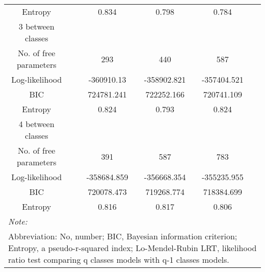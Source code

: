 \documentclass[11pt,a4paper]{article}
\begin{document}
\begin{table}
\begin{tabular}[t]{cccccc}
\hspace{1em}\hspace{1em}Entropy &  & 0.834 & 0.798 & 0.784 & \\
\hspace{1em}3 between classes &  &  &  &  & \\
\hspace{1em}\hspace{1em}No. of free parameters &  & 293 & 440 & 587 & \\
\hspace{1em}\hspace{1em}Log-likelihood &  & -360910.13 & -358902.821 & -357404.521 & \\
\hspace{1em}\hspace{1em}BIC &  & 724781.241 & 722252.166 & 720741.109 & \\
\hspace{1em}\hspace{1em}Entropy &  & 0.824 & 0.793 & 0.824 & \\
\hspace{1em}4 between classes &  &  &  &  & \\
\hspace{1em}\hspace{1em}No. of free parameters &  & 391 & 587 & 783 & \\
\hspace{1em}\hspace{1em}Log-likelihood &  & -358684.859 & -356668.354 & -355235.955 & \\
\hspace{1em}\hspace{1em}BIC &  & 720078.473 & 719268.774 & 718384.699 & \\
\hspace{1em}\hspace{1em}Entropy &  & 0.816 & 0.817 & 0.806 & \\
\bottomrule
\multicolumn{6}{l}{\textit{Note: }}\\
\multicolumn{6}{l}{Abbreviation: No, number; BIC, Bayesian information criterion; Entropy, a pseudo-r-squared index; Lo-Mendel-Rubin LRT, likelihood ratio test comparing q classes models with q-1 classes models.}\\
\end{tabular}
\end{table}

\end{document}
